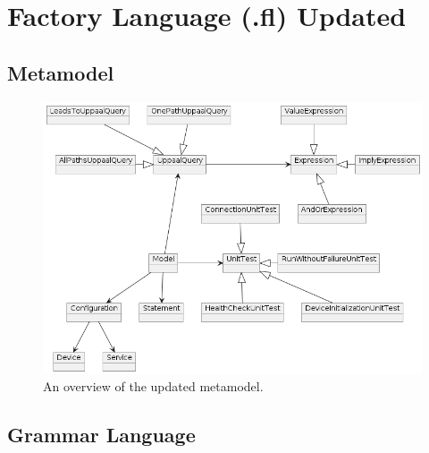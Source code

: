 
\section{Factory Language (.fl) Updated}\label{appendix:factory-lang-updated}

\subsection{Metamodel}\label{appendix:metamodel-updated} 

\begin{figure}[H]
    \centering
    \includegraphics[width=.40\textwidth]{Image/metamodel-individual.png}
    \caption{An overview of the updated metamodel.}
    \label{fig:metamodel-updated}
\end{figure}

\subsection{Grammar Language}\label{appendix:grammar-language-updated}

